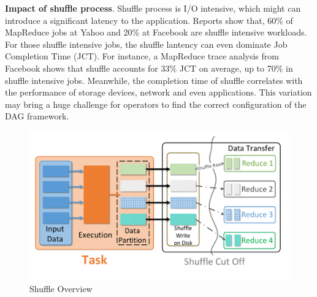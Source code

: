 
\textbf{Impact of shuffle process}. Shuffle process is I/O intensive, which might can introduce a significant latency to the application. Reports show that, 60\% of MapReduce jobs at Yahoo
and 20\% at Facebook are shuffle intensive workloads\cite{shufflewatcher}. For those shuffle intensive jobs, the shuffle lantency can even dominate Job Completion Time (JCT). 
For instance, a MapReduce trace analysis from Facebook shows that shuffle accounts for 33\% JCT on average, up to 70\% in shuffle intensive jobs\cite{managing}.
Meanwhile, the completion time of shuffle correlates with the performance of storage devices, network and even applications. 
This variation may bring a huge challenge for operators to find the correct configuration of the DAG framework.
\begin{figure}
	\centering
	\includegraphics[width=\linewidth]{fig/shuffle_process}
	\caption{Shuffle Overview}
	\label{fig:shuffle_process}
\end{figure}

